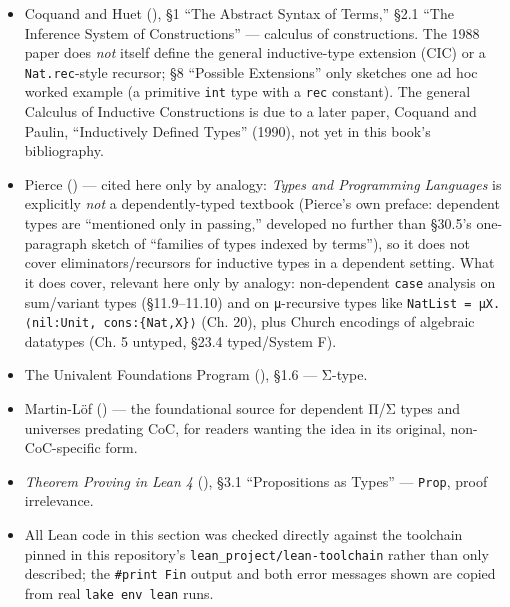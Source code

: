 \begin{itemize}
\tightlist
\item
  Coquand and Huet (\cite{CoquandHuet1988}), §1 ``The Abstract Syntax of Terms,'' §2.1 ``The Inference System of Constructions'' --- calculus of constructions. The 1988 paper does \emph{not} itself define the general inductive-type extension (CIC) or a \texttt{Nat.rec}-style recursor; §8 ``Possible Extensions'' only sketches one ad hoc worked example (a primitive \texttt{int} type with a \texttt{rec} constant). The general Calculus of Inductive Constructions is due to a later paper, Coquand and Paulin, ``Inductively Defined Types'' (1990), not yet in this book's bibliography.
\item
  Pierce (\cite{Pierce2002}) --- cited here only by analogy: \emph{Types and Programming Languages} is explicitly \emph{not} a dependently-typed textbook (Pierce's own preface: dependent types are ``mentioned only in passing,'' developed no further than §30.5's one-paragraph sketch of ``families of types indexed by terms''), so it does not cover eliminators/recursors for inductive types in a dependent setting. What it does cover, relevant here only by analogy: non-dependent \texttt{case} analysis on sum/variant types (§11.9--11.10) and on \texttt{µ}-recursive types like \texttt{NatList = μX.⟨nil:Unit, cons:\{Nat,X\}⟩} (Ch. 20), plus Church encodings of algebraic datatypes (Ch. 5 untyped, §23.4 typed/System F).
\item
  The Univalent Foundations Program (\cite{HoTT2013}), §1.6 --- Σ-type.
\item
  Martin-Löf (\cite{MartinLof1984}) --- the foundational source for dependent Π/Σ types and universes predating CoC, for readers wanting the idea in its original, non-CoC-specific form.
\item
  \emph{Theorem Proving in Lean 4} (\cite{TPIL4}), §3.1 ``Propositions as Types'' --- \texttt{Prop}, proof irrelevance.
\item
  All Lean code in this section was checked directly against the toolchain pinned in this repository's \texttt{lean\_\allowbreak{}project/\allowbreak{}lean-\allowbreak{}toolchain} rather than only described; the \texttt{\#print Fin} output and both error messages shown are copied from real \texttt{lake env lean} runs.
\end{itemize}
